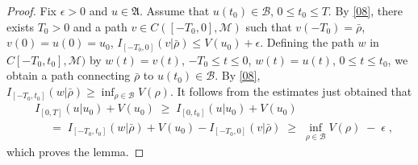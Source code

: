 \documentclass[reqno]{amsart}
\begin{document}
\begin{proof}
Fix $\epsilon >0$ and $u\in {{\mathfrak A}}$. Assume that $u(t_0) \in{{\mathscr B}}$,
$0\le t_0 \le T$. By \eqref{08}, there exists $T_0>0$ and a path $v\in
C([-T_0, 0], {{\mathscr M}})$ such that $v(-T_0) = \bar\rho$, $v(0) = u(0) = u_0$,
$I_{[-T_0, 0]}(v|\bar\rho) \le V(u_0) + \epsilon$. Defining the path
$w$ in $C [-T_0, t_0], {{\mathscr M}})$ by $w(t) = v(t)$, $-T_0 \le t\le 0$,
$w(t) = u(t)$, $0 \le t\le t_0$, we obtain a path connecting
$\bar\rho$ to $u(t_0) \in{{\mathscr B}}$. By \eqref{08}, $I_{[-T_0,t_0]}
(w|\bar\rho) \ge \inf_{\rho\in{{\mathscr B}}} V(\rho)$. It follows from the
estimates just obtained that
\begin{equation*}
\begin{split}
& I_{[0,T]} (u | u_0) + V(u_0) \;\ge\; I_{[0,t_0]} (u | u_0) + V(u_0) \\
& \quad \;=\; I_{[-T_0,t_0]} (w|\bar\rho) + V(u_0) - I_{[-T_0,0]} (v|\bar\rho)
\;\ge\; \inf_{\rho\in{{\mathscr B}}} V(\rho) \;-\; \epsilon\;,  
\end{split}
\end{equation*}
which proves the lemma.
\end{proof}
\end{document}
